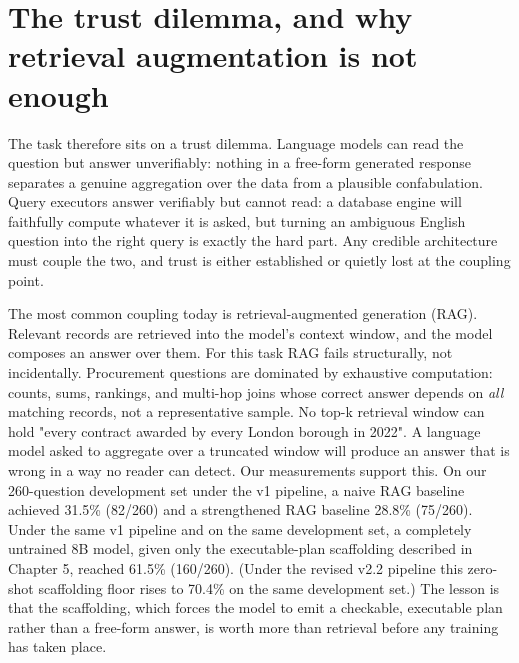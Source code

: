 \documentclass[10pt]{article} %
\begin{document}
\section{The trust dilemma, and why retrieval augmentation is not enough}\label{sec:the-trust-dilemma-and-why-retrieval-augm}

The task therefore sits on a trust dilemma. Language models can read the question but answer unverifiably: nothing in a free-form generated response separates a genuine aggregation over the data from a plausible confabulation. Query executors answer verifiably but cannot read: a database engine will faithfully compute whatever it is asked, but turning an ambiguous English question into the right query is exactly the hard part. Any credible architecture must couple the two, and trust is either established or quietly lost at the coupling point.

The most common coupling today is retrieval-augmented generation (RAG). Relevant records are retrieved into the model's context window, and the model composes an answer over them. For this task RAG fails structurally, not incidentally. Procurement questions are dominated by exhaustive computation: counts, sums, rankings, and multi-hop joins whose correct answer depends on \emph{all} matching records, not a representative sample. No top-k retrieval window can hold "every contract awarded by every London borough in 2022". A language model asked to aggregate over a truncated window will produce an answer that is wrong in a way no reader can detect. Our measurements support this. On our 260-question development set under the v1 pipeline, a naive RAG baseline achieved 31.5\% (82/260) and a strengthened RAG baseline 28.8\% (75/260). Under the same v1 pipeline and on the same development set, a completely untrained 8B model, given only the executable-plan scaffolding described in Chapter 5, reached 61.5\% (160/260). (Under the revised v2.2 pipeline this zero-shot scaffolding floor rises to 70.4\% on the same development set.) The lesson is that the scaffolding, which forces the model to emit a checkable, executable plan rather than a free-form answer, is worth more than retrieval before any training has taken place.
\end{document}

